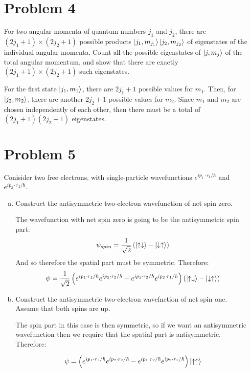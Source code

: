 \documentclass[10pt]{article}
\newcommand{\ud}{\uparrow \downarrow}
\newcommand{\du}{\downarrow \uparrow}
\newcommand{\uu}{\uparrow \uparrow}
\begin{document}
    \pagebreak

    \section*{Problem 4}

    For two angular momenta of quantum numbers $j_1$ and $j_2$, there are $(2j_1 + 1) \times (2j_2+1)$ possible products $\ket{j_1, m_{j_1}} \ket{j_2, m_{j_2}}$ of eigenstates of the individual angular momenta. Count all the possible eigenstates of $\ket{j, m_j}$ of the total angular momentum, and show that there are exactly $(2j_1 + 1) \times (2j_2 + 1)$ such eigenstates. 

    \begin{solution}
        For the first state $\ket{j_1, m_1}$, there are $2j_1 + 1$ possible values for $m_1$. Then, for $\ket{j_2, m_2}$, there are another $2j_2 + 1$ possible values for $m_2$. Since $m_1$ and $m_2$ are chosen independently of each other, then there must be a total of $(2j_1 + 1)(2j_2 + 1)$ eigenstates. 
    \end{solution}

    \pagebreak

    \section*{Problem 5}

    Conisider two free electrons, with single-particle wavefunctions $e^{ip_1\cdot r_1/\hbar}$ and $e^{ip
    _2\cdot r_2/ \hbar}$.
    
    \begin{enumerate}[(a)]
        \item Construct the antisymmetric two-electron wavefunction of net spin zero. 
        
        \begin{solution}
            The wavefunction with net spin zero is going to be the antisymmetric spin part: 
            \[ \psi_{spin} = \frac{1}{\sqrt{2}}\left( \ket{\ud} - \ket{\du}\right)\] 
            And so therefore the spatial part must be symmetric. Therefore: 
            \[ \psi = \frac{1}{\sqrt{2}}\left( e^{ip_1\cdot r_1/\hbar} e^{ip_2 \cdot r_2/\hbar} + e^{ip_1 \cdot r_2/\hbar} e^{ip_2 \cdot r_1/\hbar}\right) \left( \ket{\ud} - \ket{\du}\right)\]
        \end{solution}
        \item Construct the antisymmetric two-electron wavefnction of net spin one. Assume that both spins are up. 
        
        \begin{solution}
            The spin part in this case is then symmetric, so if we want an antisymmetric wavefunction then we require that the spatial part is antisymmetric. Therefore: 
            
            \[ \psi = \left( e^{ip_1\cdot r_1/\hbar} e^{ip_2 \cdot r_2/\hbar} - e^{ip_1 \cdot r_2/\hbar} e^{ip_2 \cdot r_1/\hbar}\right)\ket{\uu}\]
        \end{solution}
    \end{enumerate}
\end{document}
